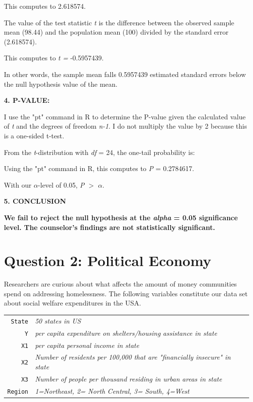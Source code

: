 \documentclass[12pt,letterpaper]{article}
\begin{document}
\begin{enumerate}
		This computes to 2.618574.
		
		The value of the test statistic \textit{t} is the difference between the observed sample mean (98.44) and the population mean (100) divided by the standard error (2.618574).
		
		
		
		This computes to \textit{t = }-0.5957439.
		
		In other words, the sample mean falls 0.5957439 estimated standard errors below the null hypothesis value of the mean. 
		
		\textbf{4. P-VALUE:}
		
		I use the "pt" command in R to determine the P-value given the calculated value of \textit{t} and the degrees of freedom \textit{n-1}. I do not multiply the value by 2 because this is a one-sided t-test. 
		
		From the \textit{t}-distribution with \textit{df} = 24, the one-tail probability is:
		
		
		
		Using the "pt" command in R, this computes to \textit{P} = 0.2784617.
		
		With our $\alpha$-level of 0.05, \textit{P} $>$ $\alpha$. 
		
		\textbf{5. CONCLUSION}
		
		\textbf{We fail to reject the null hypothesis at the \textit{alpha} = 0.05 significance level. The counselor's findings are not statistically significant. }
	\end{enumerate}
	
	\newpage
	
	\section*{Question 2: Political Economy}
	
	\noindent Researchers are curious about what affects the amount of money communities spend on addressing homelessness. The following variables constitute our data set about social welfare expenditures in the USA. \\
	\vspace{.5cm}
	
	
	\begin{tabular}{r|l}
		\texttt{State} &\emph{50 states in US} \\
		\texttt{Y} & \emph{per capita expenditure on shelters/housing assistance in state}\\
		\texttt{X1} &\emph{per capita personal income in state} \\
		\texttt{X2} &  \emph{Number of residents per 100,000 that are "financially insecure" in state}\\
		\texttt{X3} &  \emph{Number of people per thousand residing in urban areas in state} \\
		\texttt{Region} &  \emph{1=Northeast, 2= North Central, 3= South, 4=West} \\
	\end{tabular}
	
\end{document}
